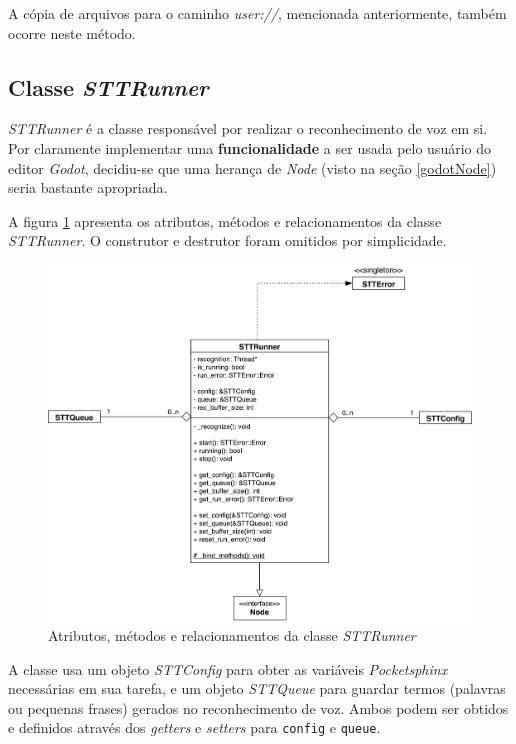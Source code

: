 A cópia de arquivos para o caminho \textit{user://}, mencionada anteriormente, também ocorre neste método.


\subsection{Classe \textit{STTRunner}}
\label{stt-runner}

\textit{STTRunner} é a classe responsável por realizar o reconhecimento de voz em si. Por claramente implementar uma \textbf{funcionalidade} a ser usada pelo usuário do editor \textit{Godot}, decidiu-se que uma herança de \textit{Node} (visto na seção \ref{godotNode}) seria bastante apropriada.

A figura \ref{stt-runner-diagram} apresenta os atributos, métodos e relacionamentos da classe \textit{STTRunner}. O construtor e destrutor foram omitidos por simplicidade.

\begin{figure}[H]
  \centering
  \includegraphics[width=.9\textwidth]{image/stt-runner.pdf}
  \caption{Atributos, métodos e relacionamentos da classe \textit{STTRunner}}
  \label{stt-runner-diagram}
\end{figure}

A classe usa um objeto \textit{STTConfig} para obter as variáveis \textit{Pocketsphinx} necessárias em sua tarefa, e um objeto \textit{STTQueue} para guardar termos (palavras ou pequenas frases) gerados no reconhecimento de voz. Ambos podem ser obtidos e definidos através dos \textit{getters} e \textit{setters} para \texttt{config} e \texttt{queue}.


